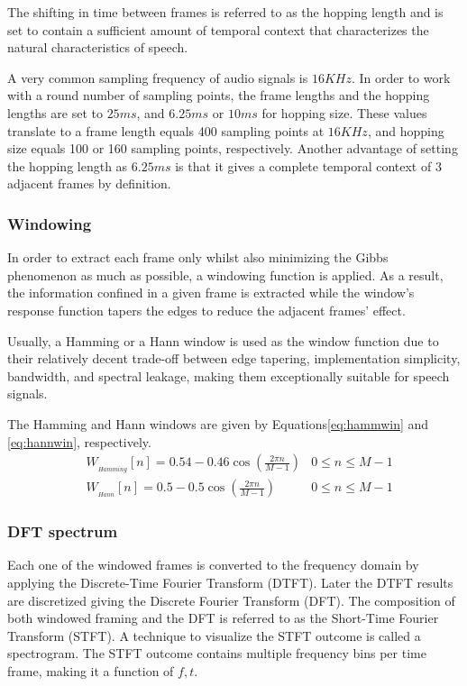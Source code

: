 The shifting in time between frames is referred
to as the hopping length and is set to contain 
a sufficient amount of temporal
context that characterizes the natural
characteristics of speech.

A very common sampling frequency of audio signals
is \(16KHz\). 
In order to work with 
a round number of sampling points, 
the frame lengths 
and the hopping lengths 
are set to \(25ms\), and 
\(6.25ms\) or \(10ms\) for hopping size. 
These values translate to a frame length
equals 400 sampling points at \(16KHz\), and hopping size
equals 100 or 160 sampling points, respectively.
Another advantage of setting the hopping length
as \(6.25ms\) is that it gives
a complete temporal context of 3 adjacent frames
by definition.

\subsubsection{Windowing}
In order to extract each frame only 
whilst also minimizing the Gibbs phenomenon as much as possible,
a windowing function is applied.
As a result, the information confined 
in a given frame is extracted while the 
window's response function tapers 
the edges to reduce the adjacent frames' effect.

Usually, a Hamming or a Hann window 
is used as the window function due to their 
relatively decent trade-off between edge tapering, 
implementation simplicity, bandwidth, and spectral leakage, 
making them exceptionally suitable for speech signals.

The Hamming and Hann windows are given by
Equations\;\ref{eq:hammwin} and \ref{eq:hannwin}, respectively.
\begin{align}
    \label{eq:hammwin} &W_{_{Hamming}}[n] = 0.54 - 0.46
    \cos\left( \frac{2\pi n}{M-1} \right) &
            0 \leq n \leq M - 1 \\
    \label{eq:hannwin} &W_{_{Hann}}[n] = 0.5 - 0.5
            \cos\left( \frac{2\pi n}{M-1} \right) &
            0 \leq n \leq M - 1
\end{align}

\subsubsection{DFT spectrum}
Each one of the windowed frames is
converted to the frequency domain by applying the 
Discrete-Time Fourier Transform (DTFT). Later the DTFT
results are discretized giving the Discrete Fourier Transform (DFT).
The composition of both windowed framing 
and the DFT is referred to as the 
Short-Time Fourier Transform (STFT).
A technique to visualize the STFT outcome is 
called a spectrogram. The STFT outcome contains 
multiple frequency bins per time frame,
making it a function of \(f, t\).

